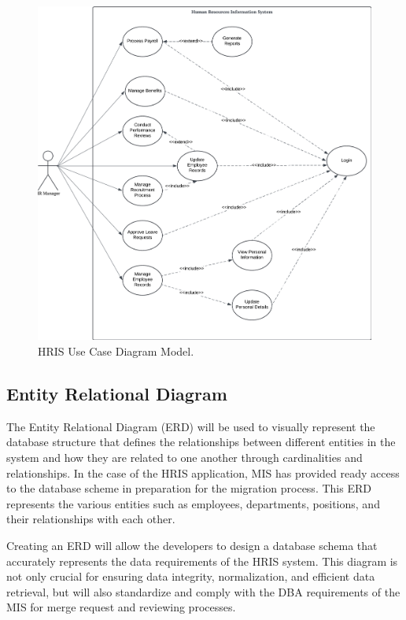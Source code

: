     \begin{figure}[H]
        \centering
        \includegraphics[width=1\linewidth]{figures/images/use-case.png}
        \caption{HRIS Use Case Diagram Model.}
        \label{fig:use-case}
    \end{figure}
    
    \subsection{Entity Relational Diagram}
    
    The Entity Relational Diagram (ERD) will be used to visually represent the database structure that defines the relationships between different entities in the system and how they are related to one another through cardinalities and relationships. In the case of the HRIS application, MIS has provided ready access to the database scheme in preparation for the migration process. This ERD represents the various entities such as employees, departments, positions, and their relationships with each other. 
    
    Creating an ERD will allow the developers to design a database schema that accurately represents the data requirements of the HRIS system. This diagram is not only crucial for ensuring data integrity, normalization, and efficient data retrieval, but will also standardize and comply with the DBA requirements of the MIS for merge request and reviewing processes.

